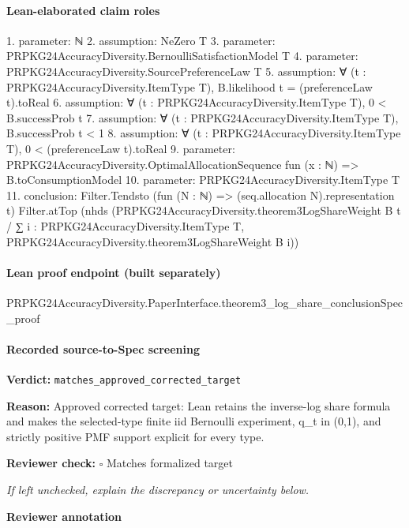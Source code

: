 \documentclass[10pt]{article}
\newcommand{\reviewerbox}{%
  \par\noindent\fbox{\parbox{0.96\linewidth}{\rule{0pt}{0.38in}}}\par
}
\newcommand{\reviewmatch}[1]{%
  \par\noindent\textbf{Reviewer check:} $\square$\; #1\par
  \noindent\emph{If left unchecked, explain the discrepancy or uncertainty below.}\par
}
\begin{document}
\paragraph{Lean-elaborated claim roles}\begin{ReviewVerbatim}
1. parameter: ℕ
2. assumption: NeZero T
3. parameter: PRPKG24AccuracyDiversity.BernoulliSatisfactionModel T
4. parameter: PRPKG24AccuracyDiversity.SourcePreferenceLaw T
5. assumption: ∀ (t : PRPKG24AccuracyDiversity.ItemType T), B.likelihood t = (preferenceLaw t).toReal
6. assumption: ∀ (t : PRPKG24AccuracyDiversity.ItemType T), 0 < B.successProb t
7. assumption: ∀ (t : PRPKG24AccuracyDiversity.ItemType T), B.successProb t < 1
8. assumption: ∀ (t : PRPKG24AccuracyDiversity.ItemType T), 0 < (preferenceLaw t).toReal
9. parameter: PRPKG24AccuracyDiversity.OptimalAllocationSequence fun (x : ℕ) => B.toConsumptionModel
10. parameter: PRPKG24AccuracyDiversity.ItemType T
11. conclusion: Filter.Tendsto (fun (N : ℕ) => (seq.allocation N).representation t) Filter.atTop
  (nhds
    (PRPKG24AccuracyDiversity.theorem3LogShareWeight B t /
      ∑ i : PRPKG24AccuracyDiversity.ItemType T, PRPKG24AccuracyDiversity.theorem3LogShareWeight B i))
\end{ReviewVerbatim}

\paragraph{Lean proof endpoint (built separately)}\begin{ReviewVerbatim}
PRPKG24AccuracyDiversity.PaperInterface.theorem3_log_share_conclusionSpec_proof
\end{ReviewVerbatim}

\paragraph{Recorded source-to-Spec screening}
\textbf{Verdict:} \texttt{matches\_approved\_corrected\_target}
\\
{\raggedright
\textbf{Reason:} Approved corrected target:\allowbreak{} Lean retains the inverse-\allowbreak{}log share formula and makes the selected-\allowbreak{}type finite iid Bernoulli experiment, q\_\allowbreak{}t in (0,1), and strictly positive PMF support explicit for every type.\allowbreak{}
\par}
\reviewmatch{Matches formalized target}
\noindent\textbf{Reviewer annotation}\par
\reviewerbox
\clearpage
\hypertarget{source-claim-a9a6608e74ff7dd3}{}
\end{document}

